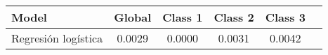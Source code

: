 \begin{tabular}{p{3cm}|c|c|c|c|c}
\toprule
               Model &  Global &  Class 1 &  Class 2 &  Class 3 \\
\midrule
 Regresión logística &  0.0029 &   0.0000 &   0.0031 &   0.0042 \\
\bottomrule
\end{tabular}
